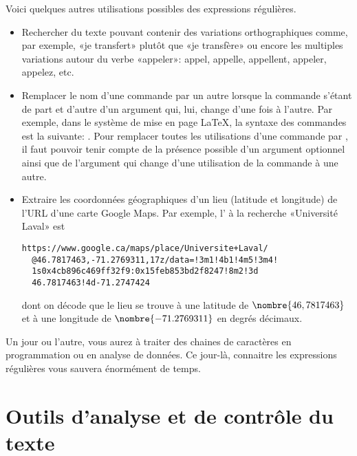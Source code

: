 Voici quelques autres utilisations possibles des expressions
régulières.
\begin{itemize}
\item Rechercher du texte pouvant contenir des variations
  orthographiques comme, par exemple, «je transfert» plutôt que «je
  transfère» ou encore les multiples variations autour du verbe
  «appeler»: appel, appelle, appellent, appeler, appelez, etc.
\item Remplacer le nom d'une commande par un autre lorsque la commande
  s'étant de part et d'autre d'un argument qui, lui, change d'une fois
  à l'autre. Par exemple, dans le système de mise en page {\LaTeX}, la
  syntaxe des commandes est la suivante:
  \cmdprint{\cmd}. Pour remplacer toutes les
  utilisations d'une commande \cmdprint{\foo} par \cmdprint{\bar}, il
  faut pouvoir tenir compte de la présence possible d'un argument
  optionnel  ainsi que de l'argument  qui
  change d'une utilisation de la commande à une autre.
\item Extraire les coordonnées géographiques d'un lieu (latitude et
  longitude) de l'URL d'une carte Google Maps. Par exemple, l'%
   à la recherche «Université Laval» est
  \begin{Schunk}
\begin{Verbatim}
https://www.google.ca/maps/place/Universite+Laval/
  @46.7817463,-71.2769311,17z/data=!3m1!4b1!4m5!3m4!
  1s0x4cb896c469ff32f9:0x15feb853bd2f8247!8m2!3d
  46.7817463!4d-71.2747424
\end{Verbatim}
  \end{Schunk}
  dont on décode que le lieu se trouve à une latitude de
  $\nombre{46,7817463}$ et à une longitude de $\nombre{-71.2769311}$
  en degrés décimaux.
\end{itemize}

Un jour ou l'autre, vous aurez à traiter des chaines de caractères en
programmation ou en analyse de données. Ce jour-là, connaitre les
expressions régulières vous sauvera énormément de temps.


\section{Outils d'analyse et de contrôle du texte}
\label{sec:texte:outils}

